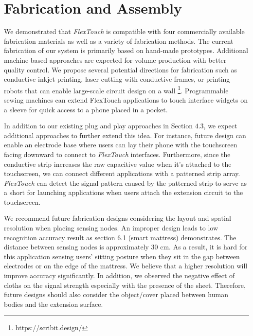 \section{Fabrication and Assembly}
We demonstrated that \textit{FlexTouch} is compatible with four commercially available fabrication materials as well as a variety of fabrication methods. The current fabrication of our system is primarily based on hand-made prototypes. Additional machine-based approaches are expected for volume production with better quality control. We propose several potential directions for fabrication such as conductive inkjet printing, laser cutting with conductive frames, or printing robots that can enable large-scale circuit design on a wall \footnote{https://scribit.design/}. Programmable sewing machines can extend FlexTouch applications to touch interface widgets on a sleeve for quick access to a phone placed in a pocket.

In addition to our existing plug and play approaches in Section $4.3$, we expect additional approaches to further extend this idea. For instance, future design can enable an electrode base where users can lay their phone with the touchscreen facing downward to connect to \textit{FlexTouch} interfaces. Furthermore, since the conductive strip increases the raw capacitive value when it's attached to the touchscreen, we can connect different applications with a patterned strip array. \textit{FlexTouch} can detect the signal pattern caused by the patterned strip to serve as a short for launching applications when users attach the extension circuit to the touchscreen.

We recommend future fabrication designs considering the layout and spatial resolution when placing sensing nodes. An improper design leads to low recognition accuracy result as section 6.1 (smart mattress) demonstrates. The distance between sensing nodes is approximately 30 cm. As a result, it is hard for this application sensing users' sitting posture when they sit in the gap between electrodes or on the edge of the mattress. We believe that a higher resolution will improve accuracy significantly. In addition, we observed the negative effect of cloths on the signal strength especially with the presence of the sheet. Therefore, future designs should also consider the object/cover placed between human bodies and the extension surface.

